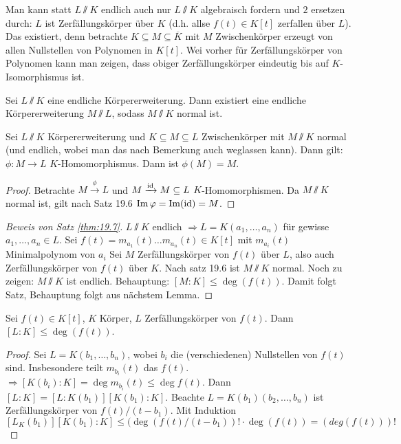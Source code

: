 \documentclass[12pt,a4paper]{scrartcl}
\begin{document}
\begin{bem}
	Man kann statt $L\sslash K$ endlich auch nur $L\sslash K$ algebraisch fordern und $2$ ersetzen durch: $L$ ist Zerfällungskörper über $K$ (d.h. allse $f(t)\in K[t]$ zerfallen über $L$). Das existiert, denn betrachte $K\subseteq M\subseteq \overline{K}$ mit $M$ Zwischenkörper erzeugt von allen Nullstellen von Polynomen in $K[t]$. Wei vorher für Zerfällungskörper von Polynomen kann man zeigen, dass obiger Zerfällungskörper eindeutig bis auf $K$-Isomorphismus ist.
\end{bem}

\begin{satz}\label{thm:19.7}
	Sei $L\sslash K$ eine endliche Körpererweiterung. Dann existiert eine endliche Körpererweiterung $M\sslash L$, sodass $M\sslash K$ normal ist.
\end{satz}
\begin{kor}
	Sei $L\sslash K$ Körpererweiterung und $K\subseteq M\subseteq L$ Zwischenkörper mit $M\sslash K$ normal (und endlich, wobei man das nach Bemerkung auch weglassen kann). Dann gilt: $\phi\colon M\to L$ $K$-Homomorphismus. Dann ist $\phi(M) = M$.	
\end{kor}
\begin{proof}
	Betrachte $M\xrightarrow{\phi}L$ und $M\xrightarrow{\operatorname{id}}M\subseteq L$ $K$-Homomorphismen. Da $M\sslash K$ normal ist, gilt nach Satz 19.6 $\operatorname{Im}\varphi = \operatorname{Im}(\operatorname{id}) = M$.
\end{proof}

\begin{proof}[Beweis von Satz \ref{thm:19.7}]
	$L\sslash K$ endlich $\Rightarrow L = K(a_1,\dots, a_n)$ für gewisse $a_1,\dots,a_n\in L$. Sei $f(t) = m_{a_1}(t)\dots m_{a_n}(t)\in K[t]$ mit $m_{a_i}(t)$ Minimalpolynom von $a_i$ Sei $M$ Zerfällungskörper von $f(t)$ über $L$, also auch Zerfällungskörper von $f(t)$ über $K$. Nach satz 19.6 ist $M\sslash K$ normal. Noch zu zeigen: $M\sslash K$ ist endlich. Behauptung: $[M:K]\leq \deg(f(t))$. Damit folgt Satz, Behauptung folgt aus nächstem Lemma.
\end{proof}
\begin{lem} Sei $f(t)\in K[t]$, $K$ Körper, $L$ Zerfällungskörper von $f(t)$. Dann $[L:K]\leq\deg(f(t))$.
\end{lem}
\begin{proof}
	Sei $L = K(b_1,\dots, b_n)$, wobei $b_i$ die (verschiedenen) Nullstellen von $f(t)$ sind. Insbesondere teilt $m_{b_i}(t)$ das $f(t)$. $\Rightarrow [K(b_i):K] = \deg m_{b_i}(t)\leq \deg f(t)$. Dann $[L:K] = [L:K(b_1)][K(b_1):K]$. Beachte $L = K(b_1)(b_2,\dots, b_n)$ ist Zerfällungskörper von $f(t)/(t-b_1)$. Mit Induktion $[L_K(b_1)][K(b_1):K]\leq (\deg(f(t)/(t-b_1))!\cdot\deg(f(t)) = (deg(f(t)))!$
\end{proof}
\end{document}
